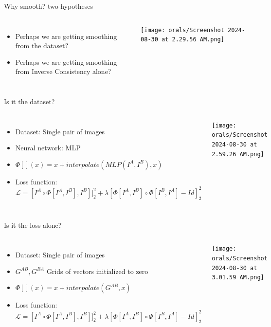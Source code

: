 \documentclass{beamer}
\begin{document}
\begin{frame}{Why smooth? two hypotheses}
	\begin{columns}
	\begin{itemize} 
		\item Perhaps we are getting smoothing from the dataset?
		\item Perhaps we are getting smoothing from Inverse Consistency alone?
	\end{itemize}
		\texttt{[image: orals/Screenshot 2024-08-30 at 2.29.56 AM.png]}
	\end{columns}
	\end{frame}
\begin{frame}{Is it the dataset?}
	\begin{columns}
		\column{.5\textwidth}
	\begin{itemize} 
		\item Dataset: Single pair of images
		\item Neural network: MLP
		\item $\Phi[](x) = x + interpolate(MLP(I^A, I^B), x)$
		   \item Loss function: $\mathcal{L} = [I^A \circ \Phi[I^A, I^B], I^B]]^2_2 + \lambda [\Phi[I^A, I^B] \circ \Phi[I^B, I^A] - Id ]^2_2$
	\end{itemize}
		\column{.5\textwidth}
		\texttt{[image: orals/Screenshot 2024-08-30 at 2.59.26 AM.png]}
	\end{columns}
	\end{frame}
\begin{frame}{Is it the loss alone?}
	\begin{columns}
	\begin{itemize} 
		\item Dataset: Single pair of images
		\item $G^{AB}, G^{BA}$ Grids of vectors initialized to zero
		\item $\Phi[](x) = x + interpolate(G^{AB}, x)$
		   \item Loss function: $\mathcal{L} = [I^A \circ \Phi[I^A, I^B], I^B]]^2_2 + \lambda [\Phi[I^A, I^B] \circ \Phi[I^B, I^A] - Id ]^2_2$
	\end{itemize}
		\texttt{[image: orals/Screenshot 2024-08-30 at 3.01.59 AM.png]}
	\end{columns}
	\end{frame}
\end{document}
